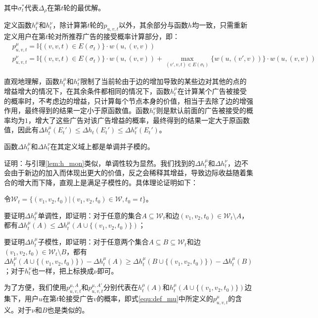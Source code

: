\noindent 其中$\sigma_t^{*}$代表$\Delta_\rho$在第$t$轮的最优解。

定义函数$h_t^\mu$和$h_t^\nu$，除计算第$t$轮的$p_{u,v,t}$以外，其余部分与函数$h$均一致，只需重新定义用户在第$t$轮对所推荐广告的接受概率计算部分，即：
\begin{align}
    &p_{u,v,t}^\mu=\mathbb{I}\{(v,v,t)\in E(\sigma_t)\}\cdot w(u,(v,v)) \label{equ:def_mu}\\
    &p_{u,v,t}^\nu=\mathbb{I}\{(v,v,t)\in E(\sigma_t)\}\cdot w(u,(v,v)) + \max_{(v',v,t)\in E(\sigma_t)}\{w(u,(v',v))\}\cdot w(u,(v,v)) \label{equ:def_nu}
\end{align}

直观地理解，函数$h_t^\mu$和$h_t^\nu$限制了当前轮由于边的增加导致的某些边对其他的点的增益增大的情况下，在其余条件都相同的情况下，函数$h_t^\mu$在计算某个广告被接受的概率时，不考虑边的增益，只计算每个节点本身的价值，相当于去除了边的增强作用，最终得到的结果一定小于原函数值。函数$h_t^\nu$则是默认前面的广告被接受的概率均为$1$，增大了这些广告对该广告增益的概率，最终得到的结果一定大于原函数值，因此有$\Delta h_t^\mu(E_t') \le \Delta h_t(E_t') \le \Delta h_t^\nu(E_t')$。

\begin{lemma}
\label{lem:mon_sub}
函数$\Delta h_t^\mu$和$ \Delta h_t^\nu$在其定义域上都是单调并子模的。
\end{lemma}

证明：与引理\ref{lem:h_mon}类似，单调性较为显然。我们找到的$\Delta h_t^\mu$和$ \Delta h_t^\nu$，边不会由于新边的加入而体现出更大的价值，反之会稀释其增益，导致边际收益随着集合的增大而下降，直观上是满足子模性的。具体理论证明如下：

令$\mathcal{W}_t=\{(v_1,v_2,t_0) |(v_1,v_2,t_0) \in \mathcal{W},t_0=t\}$。

要证明$\Delta h_t^\mu$单调性，即证明：对于任意的集合$A \subseteq \mathcal{W}_t$和边$(v_1,v_2,t_0) \in \mathcal{W}_t\setminus A$，都有$\Delta h_t^\mu(A)\le \Delta h_t^\mu(A\cup\{(v_1,v_2,t_0)\})$；

要证明$\Delta h_t^\mu$子模性，即证明：对于任意两个集合$A\subseteq B \subseteq \mathcal{W}_t$和边$(v_1,v_2,t_0) \in \mathcal{W}_t \setminus B$，都有$\Delta h_t^\mu(A \cup \{(v_1,v_2,t_0)\})-\Delta h_t^\mu(A) \ge \Delta h_t^\mu(B\cup \{(v_1,v_2,t_0)\})- \Delta h_t^\mu(B)$；对于$h_t^\nu$也一样，把上标换成$\nu$即可。

为了方便，我们使用$p_{u,v,t}^{\mu,A}$和$p_{u,v,t}^{\mu,A'}$分别代表在$h_t^\mu(A)$和$h_t^\mu(A\cup\{(v_1,v_2,t_0)\})$边集下，用户$u$在第$t$轮接受广告$v$的概率，即式\ref{equ:def_mu}中所定义的$p_{u,v,t}^\mu$的含义。对于$\nu$和$B$也是类似的。

